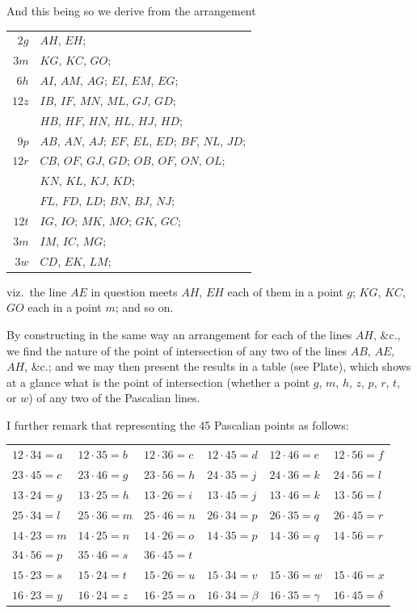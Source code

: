 \documentclass[11pt,a4paper]{article}
\theoremstyle{definition}
\begin{document}
And this being so we derive from the arrangement
\begin{center}
\begin{tabular}{rl}
$2g$ & $AH$, $EH$;\\
$3m$ & $KG$, $KC$, $GO$;\\
$6h$ & $AI$, $AM$, $AG$; $EI$, $EM$, $EG$;\\
$12z$ & $IB$, $IF$, $MN$, $ML$, $GJ$, $GD$;\\
    & $HB$, $HF$, $HN$, $HL$, $HJ$, $HD$;\\
$9p$ & $AB$, $AN$, $AJ$; $EF$, $EL$, $ED$; $BF$, $NL$, $JD$;\\
$12r$ & $CB$, $OF$, $GJ$, $GD$; $OB$, $OF$, $ON$, $OL$;\\
    & $KN$, $KL$, $KJ$, $KD$;\\
    & $FL$, $FD$, $LD$; $BN$, $BJ$, $NJ$;\\
$12t$ & $IG$, $IO$; $MK$, $MO$; $GK$, $GC$;\\
$3m$ & $IM$, $IC$, $MG$;\\
$3w$ & $CD$, $EK$, $LM$;
\end{tabular}
\end{center}
viz.\ the line $AE$ in question meets $AH$, $EH$ each of them in a point $g$; $KG$, $KC$, $GO$ each in a point $m$; and so on.

By constructing in the same way an arrangement for each of the lines $AH$, \&c., we find the nature of the point of intersection of any two of the lines $AB$, $AE$, $AH$, \&c.; and we may then present the results in a table (see Plate), which shows at a glance what is the point of intersection (whether a point $g$, $m$, $h$, $z$, $p$, $r$, $t$, or $w$) of any two of the Pascalian lines.

I further remark that representing the 45 Pascalian points as follows:
\begin{center}
\small
\begin{tabular}{llllll}
$12 \cdot 34 = a$ & $12 \cdot 35 = b$ & $12 \cdot 36 = c$ & $12 \cdot 45 = d$ & $12 \cdot 46 = e$ & $12 \cdot 56 = f$\\
$23 \cdot 45 = c$ & $23 \cdot 46 = g$ & $23 \cdot 56 = h$ & $24 \cdot 35 = j$ & $24 \cdot 36 = k$ & $24 \cdot 56 = l$\\
$13 \cdot 24 = g$ & $13 \cdot 25 = h$ & $13 \cdot 26 = i$ & $13 \cdot 45 = j$ & $13 \cdot 46 = k$ & $13 \cdot 56 = l$\\
$25 \cdot 34 = l$ & $25 \cdot 36 = m$ & $25 \cdot 46 = n$ & $26 \cdot 34 = p$ & $26 \cdot 35 = q$ & $26 \cdot 45 = r$\\
$14 \cdot 23 = m$ & $14 \cdot 25 = n$ & $14 \cdot 26 = o$ & $14 \cdot 35 = p$ & $14 \cdot 36 = q$ & $14 \cdot 56 = r$\\
$34 \cdot 56 = p$ & $35 \cdot 46 = s$ & $36 \cdot 45 = t$ & & & \\
$15 \cdot 23 = s$ & $15 \cdot 24 = t$ & $15 \cdot 26 = u$ & $15 \cdot 34 = v$ & $15 \cdot 36 = w$ & $15 \cdot 46 = x$\\
$16 \cdot 23 = y$ & $16 \cdot 24 = z$ & $16 \cdot 25 = \alpha$ & $16 \cdot 34 = \beta$ & $16 \cdot 35 = \gamma$ & $16 \cdot 45 = \delta$
\end{tabular}
\end{center}
\end{document}
